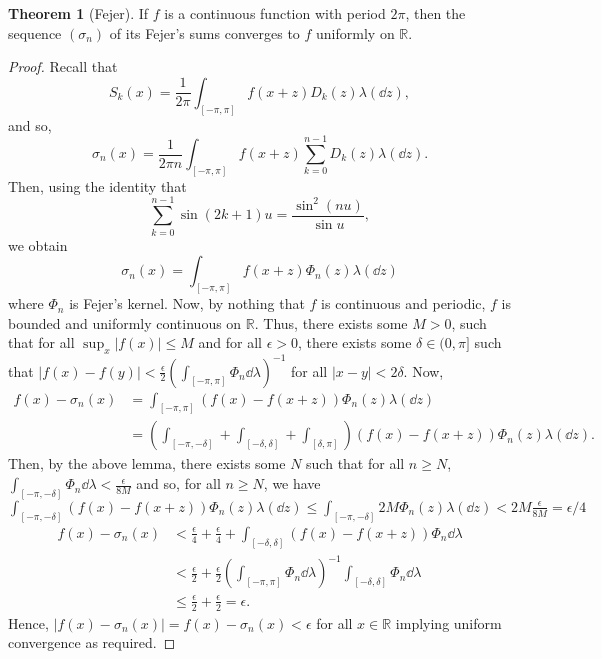 \documentclass[]{article}
\theoremstyle{definition}
\newtheorem{theorem}{Theorem}
\theoremstyle{definition}
\begin{document}
\begin{theorem}[Fejer]
  If \(f\) is a continuous function with period \(2\pi\), then the sequence \((\sigma_n)\) 
  of its Fejer's sums converges to \(f\) uniformly on \(\mathbb{R}\).
\end{theorem}
\begin{proof}
  Recall that 
  \[S_k(x) = \frac{1}{2\pi} \int_{[-\pi, \pi]} f(x + z) D_k(z) \lambda(\dd z),\]
  and so, 
  \[\sigma_n(x) = \frac{1}{2\pi n} \int_{[-\pi, \pi]} f(x + z) \sum_{k = 0}^{n - 1} D_k(z) \lambda(\dd z).\]
  Then, using the identity that 
  \[\sum_{k = 0}^{n - 1} \sin(2k + 1)u = \frac{\sin^2(nu)}{\sin u},\]
  we obtain
  \[\sigma_n(x) = \int_{[-\pi, \pi]} f(x + z) \Phi_n(z) \lambda(\dd z)\]
  where \(\Phi_n\) is Fejer's kernel. Now, by nothing that \(f\) is continuous and 
  periodic, \(f\) is bounded and uniformly continuous on \(\mathbb{R}\). Thus, 
  there exists some \(M > 0\), such that for all \(\sup_x |f(x)| \le M\) and for 
  all \(\epsilon > 0\), there exists some \(\delta \in (0, \pi]\) such that 
  \(|f(x) - f(y)| < \frac{\epsilon}{2}\left(\int_{[-\pi, \pi]} \Phi_n \dd \lambda\right)^{-1}\) 
  for all \(|x - y| < 2\delta\). Now, 
  \[\begin{split}
    f(x) - \sigma_n(x) & = \int_{[-\pi, \pi]}(f(x) - f(x + z))\Phi_n(z) \lambda(\dd z)\\
    & = \left(\int_{[-\pi, -\delta]} + \int_{[-\delta, \delta]} + \int_{[\delta, \pi]}\right)
      (f(x) - f(x + z))\Phi_n(z) \lambda(\dd z).
  \end{split}\]
  Then, by the above lemma, there exists some \(N\) such that for all \(n \ge N\), 
  \(\int_{[-\pi, -\delta]}\Phi_n \dd \lambda < \frac{\epsilon}{8M}\) and so, for all 
  \(n \ge N\), we have \(\int_{[-\pi, -\delta]} (f(x) - f(x + z))\Phi_n(z) \lambda(\dd z) \le 
  \int_{[-\pi, -\delta]} 2M \Phi_n(z) \lambda(\dd z) < 2M \frac{\epsilon}{8M} = \epsilon / 4\)
  \[\begin{split}
    f(x) - \sigma_n(x) & < \frac{\epsilon}{4} + \frac{\epsilon}{4} +
    \int_{[-\delta, \delta]} (f(x) - f(x + z))\Phi_n \dd \lambda \\
    & < \frac{\epsilon}{2} + \frac{\epsilon}{2}\left(\int_{[-\pi, \pi]} \Phi_n \dd \lambda\right)^{-1}
      \int_{[-\delta, \delta]} \Phi_n \dd \lambda\\
    & \le \frac{\epsilon}{2} + \frac{\epsilon}{2} = \epsilon.
  \end{split}\] 
  Hence, \(|f(x) - \sigma_n(x)| = f(x) - \sigma_n(x) < \epsilon\) for all \(x \in \mathbb{R}\) 
  implying uniform convergence as required.
\end{proof}
\end{document}
